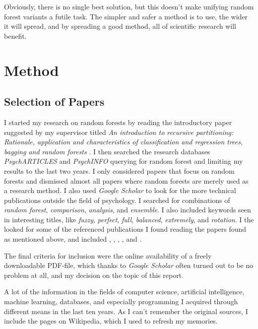 \documentclass[a4paper,man,12pt,apacite,floatsintext,draftfirst]{apa6} %
\begin{document}
Obviously, there is no single best solution, but this doesn't make unifying
random forest variants a futile task.
The simpler and safer a method is to use, the wider it will spread, and by
spreading a good method, all of scientific research will benefit.

\newpage
\section{Method}
\subsection{Selection of Papers}
I started my research on random forests by reading the
introductory paper suggested by my supervisor titled
\emph{An introduction to recursive partitioning: Rationale, application
and characteristics of classification and regression trees, bagging and
random forests} \cite{strobl2009introduction}.
I then searched the research databases \emph{PsychARTICLES} and
\emph{PsychINFO} querying for random forest and limiting my results
to the last two years.
I only considered papers that focus on random forests and
dismissed almost all papers where random forests are merely used as a
research method.
I also used \emph{Google Scholar} to look for the more technical
publications outside the field of psychology.
I searched for combinations of \emph{random forest}, \emph{comparison},
\emph{analysis}, and \emph{ensemble}.
I also included keywords seen in interesting titles, like \emph{fuzzy},
\emph{perfect}, \emph{full}, \emph{balanced}, \emph{extremely}, and
\emph{rotation}.
I the looked for some of the referenced publications I found reading the
papers found as mentioned above, and included \cite{strobl2008conditional},
\cite{ho1998random}, \cite{breiman1996bagging}, \cite{freund1995decision},
and \cite{long2010random}.

The final criteria for inclusion were the online availability of a freely
downloadable PDF-file, which thanks to \emph{Google Scholar} often turned
out to be no problem at all, and my decision on the topic of
this report.

A lot of the information in the fields of computer science, artificial
intelligence, machine learning, databases, and especially programming
I acquired through different means in the last ten years.
As I can't remember the original sources, I include the pages
on Wikipedia, which I used to refresh my memories.
\end{document}

